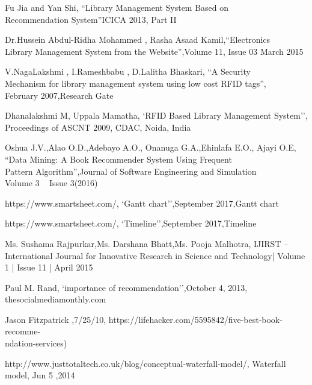 \documentclass[a4paper,12pt]{report}
\begin{document}
\begin{enumerate}[label={[\arabic*]}]
    \item Fu Jia and Yan Shi, {``Library Management System Based on \\
    Recommendation System''}ICICA 2013, Part II

    \item Dr.Hussein Abdul-Ridha Mohammed , Rasha Asaad Kamil,{``Electronics \\
    Library Management System from the Website''},Volume 11, Issue 03 March 2015

    \item V.NagaLakshmi , I.Rameshbabu , D.Lalitha Bhaskari, {``A Security \\
    Mechanism for library management system using low cost RFID tags''},\\
    February 2007,Research Gate

    \item Dhanalakshmi M, Uppala Mamatha, {`RFID Based Library Management System''},
    Proceedings of ASCNT 2009, CDAC, Noida, India

    \item Oshua J.V.,Alao O.D.,Adebayo A.O., Onanuga G.A.,Ehinlafa E.O., Ajayi O.E,
     {``Data Mining: A Book Recommender System Using Frequent \\
     Pattern Algorithm''},Journal of Software Engineering and Simulation \\
     Volume 3 ~ Issue 3(2016)

    \item https://www.smartsheet.com/, {`Gantt chart''},September 2017,Gantt chart

    \item https://www.smartsheet.com/, {`Timeline''},September 2017,Timeline

    \item Ms. Sushama Rajpurkar,Ms. Darshana Bhatt,Ms. Pooja Malhotra,
    IJIRST –International Journal for Innovative Research in Science and Technology|
     Volume 1 | Issue 11 | April 2015

    \item Paul M. Rand, {`importance of recommendation''},October 4,
    2013, thesocialmediamonthly.com

    \item Jason Fitzpatrick ,7/25/10,
    https://lifehacker.com/5595842/five-best-book-recomme-\\
    ndation-services)

    \item http://www.justtotaltech.co.uk/blog/conceptual-waterfall-model/,
     Waterfall model, Jun 5 ,2014


\end{enumerate}
\end{document}
